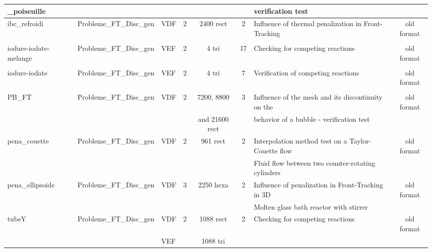 \begin{table}[H]
\begin{centering}
\begin{tabular}{lclccclc}
\rowcolor{Orchid!10}\_poiseuille & & & & & & verification test & \\
\hline
\rowcolor{Orchid!10}ibc\_refroidi & Probleme\_FT\_Disc\_gen & VDF & 2 & 2400 rect & 2 & Influence of thermal penalization in Front-Tracking & old format \\ 
\rowcolor{Orchid!10} & & & & & & &  \\
\hline
\rowcolor{Orchid!10}iodure-iodate-melange & Probleme\_FT\_Disc\_gen & VEF & 2 & 4 tri & 17 & Checking for competing reactions & old format \\ 
\rowcolor{Orchid!10} & & & & & & & \\
\hline
\rowcolor{Orchid!10}iodure-iodate & Probleme\_FT\_Disc\_gen & VEF & 2 & 4 tri & 7 & Verification of competing reactions & old format \\ 
\rowcolor{Orchid!10} & & & & & & &  \\
\hline
\rowcolor{Orchid!10}PB\_FT & Probleme\_FT\_Disc\_gen & VDF & 2 & 7200, 8800 & 3 & Influence of the mesh and its discontinuity on the  & old format \\ 
\rowcolor{Orchid!10} & & & & and 21600 rect & & behavior of a bubble - verification test & \\
\hline
\rowcolor{Orchid!10}pena\_couette & Probleme\_FT\_Disc\_gen & VDF & 2 & 961 rect & 2 & Interpolation method test on a Taylor-Couette flow & old format \\ 
\rowcolor{Orchid!10} & & & & & & Fluid flow between two counter-rotating cylinders & \\
\hline
\rowcolor{Orchid!10}pena\_ellipsoide & Probleme\_FT\_Disc\_gen & VDF & 3 & 2250 hexa & 2 & Influence of penalization in Front-Tracking in 3D & old format \\ 
\rowcolor{Orchid!10} & & & & & & Molten glass bath reactor with stirrer & \\
\hline
\rowcolor{Orchid!10}tubeY & Probleme\_FT\_Disc\_gen & VDF & 2 & 1088 rect & 2 & Checking for competing reactions & old format \\ 
\rowcolor{Orchid!10} & & VEF & & 1088 tri & & & \\
\hline
\end{tabular}
\end{centering}
\end{table}

\newpage

